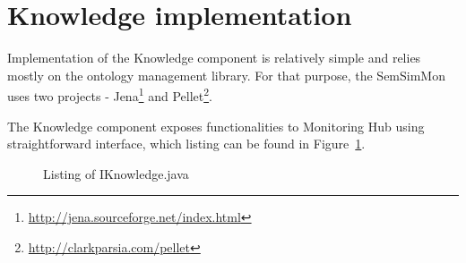 \section{Knowledge implementation}

Implementation of the Knowledge component is relatively simple and relies mostly on the ontology management library. For that purpose, the SemSimMon uses two projects - Jena\footnote{\url{http://jena.sourceforge.net/index.html}} and Pellet\footnote{\url{http://clarkparsia.com/pellet}}. 

The Knowledge component exposes functionalities to Monitoring Hub using straightforward interface, which listing can be found in Figure~\ref{fig:iknowledge_java}.

\begin{figure}[ht]
  \centering
  
  \caption{Listing of IKnowledge.java}
  \label{fig:iknowledge_java}
\end{figure} 

